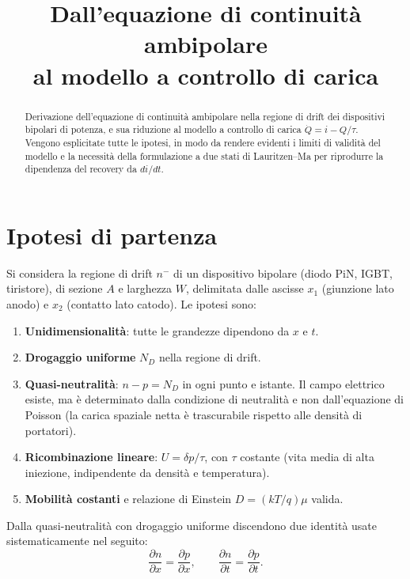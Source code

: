 \documentclass[11pt,a4paper]{article}
\title{Dall'equazione di continuit\`a ambipolare\\ al modello a controllo di carica}
\author{}
\date{}
\newcommand{\dpar}[2]{\frac{\partial #1}{\partial #2}}
\begin{document}
\maketitle

\begin{abstract}
\noindent
Derivazione dell'equazione di continuit\`a ambipolare nella regione di drift dei
dispositivi bipolari di potenza, e sua riduzione al modello a controllo di carica
$\dot{Q} = i - Q/\tau$. Vengono esplicitate tutte le ipotesi, in modo da rendere
evidenti i limiti di validit\`a del modello e la necessit\`a della formulazione a
due stati di Lauritzen--Ma per riprodurre la dipendenza del recovery da $di/dt$.
\end{abstract}

\section{Ipotesi di partenza}

Si considera la regione di drift $n^-$ di un dispositivo bipolare (diodo PiN, IGBT,
tiristore), di sezione $A$ e larghezza $W$, delimitata dalle ascisse $x_1$ (giunzione
lato anodo) e $x_2$ (contatto lato catodo). Le ipotesi sono:

\begin{enumerate}
  \item \textbf{Unidimensionalit\`a}: tutte le grandezze dipendono da $x$ e $t$.
  \item \textbf{Drogaggio uniforme} $N_D$ nella regione di drift.
  \item \textbf{Quasi-neutralit\`a}: $n - p = N_D$ in ogni punto e istante. Il campo
        elettrico esiste, ma \`e determinato dalla condizione di neutralit\`a e non
        dall'equazione di Poisson (la carica spaziale netta \`e trascurabile rispetto
        alle densit\`a di portatori).
  \item \textbf{Ricombinazione lineare}: $U = \delta p / \tau$, con $\tau$ costante
        (vita media di alta iniezione, indipendente da densit\`a e temperatura).
  \item \textbf{Mobilit\`a costanti} e relazione di Einstein $D = (kT/q)\mu$ valida.
\end{enumerate}

Dalla quasi-neutralit\`a con drogaggio uniforme discendono due identit\`a usate
sistematicamente nel seguito:
\begin{equation}
  \dpar{n}{x} = \dpar{p}{x}, \qquad \dpar{n}{t} = \dpar{p}{t}.
  \label{eq:neutralita}
\end{equation}
\end{document}
